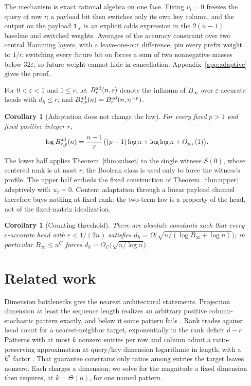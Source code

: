 \documentclass[10pt]{article}
\newtheorem{corollary}[theorem]{Corollary}
\theoremstyle{definition}
\newcommand{\one}{\mathbf 1}
\begin{document}
The mechanism is exact rational algebra on one face.  Fixing \(v_i=0\)
freezes the query of row \(i\); a payload bit then switches only its own key
column, and the output on the payload \(\one_X\) is an explicit odds
expression in the \(2(n-1)\) baseline and switched weights.  Averages of the
accuracy constraint over two central Hamming layers, with a leave-one-out
difference, pin every prefix weight to \(1/i\); switching every future bit
on forces a sum of two nonnegative masses below \(32\varepsilon\), so future
weight cannot hide in cancellation.  Appendix~\ref{app:adaptive} gives the
proof.

For \(0<\varepsilon<1\) and \(1\le r\), let
\(B^{\rm ad}_{r}(n,\varepsilon)\) denote the infimum of \(B_\infty\) over
\(\varepsilon\)-accurate heads with \(d_h\le r\), and
\(B^{\rm ad}_{r,p}(n)=B^{\rm ad}_r(n,n^{-p})\).

\begin{corollary}[Adaptation does not change the law]\label{cor:adaptive}
For every fixed \(p>1\) and fixed positive integer \(r\),
\[
 \log B^{\rm ad}_{r,p}(n)
 =\frac{n-1}{r}\bigl((p-1)\log n+\log\log n+O_{p,r}(1)\bigr).
\]
\end{corollary}

The lower half applies Theorem~\ref{thm:subset} to the single witness
\(S(0)\), whose centered rank is at most \(r\); the Boolean class is used
only to force the witness's profile.  The upper half embeds the fixed
construction of Theorem~\ref{thm:upper} adaptively with \(u_j=0\).  Content
adaptation through a linear payload channel therefore buys nothing at fixed
rank: the two-term law is a property of the head, not of the fixed-matrix
idealization.

\begin{corollary}[Counting threshold]\label{cor:adaptivewidth}
There are absolute constants such that every \(\varepsilon\)-accurate head
with \(\varepsilon<1/(2n)\) satisfies
\(d_h=\Omega\bigl(\sqrt{n/(\log B_\infty+\log n)}\bigr)\); in particular
\(B_\infty\le n^C\) forces \(d_h=\Omega_C\bigl(\sqrt{n/\log n}\bigr)\).
\end{corollary}

\section{Related work}

Dimension bottlenecks give the nearest architectural statements.  Projection
dimension at least the sequence length realizes an arbitrary positive
column-stochastic pattern exactly, and below it some pattern fails
\cite{bhojanapalli2020}.  Rank trades against head count for a
nearest-neighbor target, exponentially in the rank deficit \(d-r\)
\cite{amsel2024}.  Patterns with at most \(k\) nonzero entries per row and
column admit a ratio-preserving approximation at query/key dimension
logarithmic in length, with a \(k^2\) factor \cite{likhosherstov2023}.  That
guarantee constrains only ratios among entries the target leaves nonzero.
Each charges a dimension; we solve for the magnitude a fixed dimension then
requires, at \(k=\Theta(n)\), for one named pattern.
\end{document}
